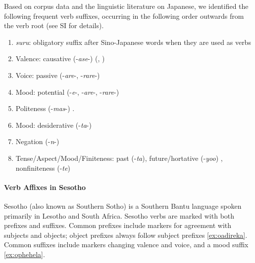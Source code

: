 Based on corpus data and the linguistic literature on Japanese, we identified the following frequent verb suffixes, occurring in the following order outwards from the verb root (see SI for details).


\begin{enumerate}
\item \textit{suru}: obligatory suffix after Sino-Japanese words when they are used as verbs
\item Valence: causative (-\textit{ase}-) (\citet[142]{hasegawa2014japanese}, \citet[Chapter 13]{kaiser2013japanese})
\item Voice: passive (-\textit{are}-, -\textit{rare}-) \cite[152]{hasegawa2014japanese} \cite[Chapter 12]{kaiser2013japanese}
\item Mood: potential (-\textit{e}-, -\textit{are}-, -\textit{rare}-) \cite[398]{kaiser2013japanese}  
\item Politeness (-\textit{mas}-) \cite[190]{kaiser2013japanese}.
\item Mood: desiderative (-\textit{ta}-) \cite[238]{kaiser2013japanese}
\item Negation (-\textit{n}-)
\item Tense/Aspect/Mood/Finiteness: past (-\textit{ta}), future/hortative (-\textit{yoo}) \cite[229]{kaiser2013japanese}, nonfiniteness (-\textit{te}) \cite[186]{kaiser2013japanese}
\end{enumerate}







\paragraph{Verb Affixes in Sesotho}
Sesotho (also known as Southern Sotho) is a Southern Bantu language spoken primarily in Lesotho and South Africa.
Sesotho verbs are marked with both prefixes and suffixes.
Common prefixes include markers for agreement with subjects and objects; object prefixes always follow subject prefixes \ref{ex:oadireka}.
Common suffixes include markers changing valence and voice, and a mood suffix \ref{ex:ophehela}.

